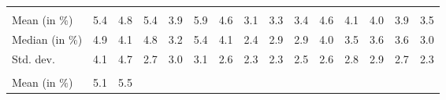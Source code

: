 \begin{tabular}{lllllllllllllll}
  \multicolumn{1}{|r}{} &
  \multicolumn{1}{r}{} &
  \multicolumn{1}{r}{} &
  \multicolumn{1}{r}{} &
  \multicolumn{1}{r}{} &
  \multicolumn{1}{r}{} &
  \multicolumn{1}{r}{} &
  \multicolumn{1}{r}{} &
  \multicolumn{1}{r}{} &
  \multicolumn{1}{r}{} &
  \multicolumn{1}{r}{} &
  \multicolumn{1}{r}{} &
  \multicolumn{1}{r}{} &
  \multicolumn{1}{r}{} \\
\multicolumn{1}{l}{\hspace{2em}Mean (in $\%$)} &
  \multicolumn{1}{|r}{5.4} &
  \multicolumn{1}{r}{4.8} &
  \multicolumn{1}{r}{5.4} &
  \multicolumn{1}{r}{3.9} &
  \multicolumn{1}{r}{5.9} &
  \multicolumn{1}{r}{4.6} &
  \multicolumn{1}{r}{3.1} &
  \multicolumn{1}{r}{3.3} &
  \multicolumn{1}{r}{3.4} &
  \multicolumn{1}{r}{4.6} &
  \multicolumn{1}{r}{4.1} &
  \multicolumn{1}{r}{4.0} &
  \multicolumn{1}{r}{3.9} &
  \multicolumn{1}{r}{3.5} \\
\multicolumn{1}{l}{\hspace{2em}Median (in $\%$)} &
  \multicolumn{1}{|r}{4.9} &
  \multicolumn{1}{r}{4.1} &
  \multicolumn{1}{r}{4.8} &
  \multicolumn{1}{r}{3.2} &
  \multicolumn{1}{r}{5.4} &
  \multicolumn{1}{r}{4.1} &
  \multicolumn{1}{r}{2.4} &
  \multicolumn{1}{r}{2.9} &
  \multicolumn{1}{r}{2.9} &
  \multicolumn{1}{r}{4.0} &
  \multicolumn{1}{r}{3.5} &
  \multicolumn{1}{r}{3.6} &
  \multicolumn{1}{r}{3.6} &
  \multicolumn{1}{r}{3.0} \\
\multicolumn{1}{l}{\hspace{2em}Std. dev.} &
  \multicolumn{1}{|r}{4.1} &
  \multicolumn{1}{r}{4.7} &
  \multicolumn{1}{r}{2.7} &
  \multicolumn{1}{r}{3.0} &
  \multicolumn{1}{r}{3.1} &
  \multicolumn{1}{r}{2.6} &
  \multicolumn{1}{r}{2.3} &
  \multicolumn{1}{r}{2.3} &
  \multicolumn{1}{r}{2.5} &
  \multicolumn{1}{r}{2.6} &
  \multicolumn{1}{r}{2.8} &
  \multicolumn{1}{r}{2.9} &
  \multicolumn{1}{r}{2.7} &
  \multicolumn{1}{r}{2.3} \\
\multicolumn{1}{l}{\hspace{1em}{\textit{Additive term} ($\widehat{t}/\widetilde{p}$)}} &
  \multicolumn{1}{|r}{} &
  \multicolumn{1}{r}{} &
  \multicolumn{1}{r}{} &
  \multicolumn{1}{r}{} &
  \multicolumn{1}{r}{} &
  \multicolumn{1}{r}{} &
  \multicolumn{1}{r}{} &
  \multicolumn{1}{r}{} &
  \multicolumn{1}{r}{} &
  \multicolumn{1}{r}{} &
  \multicolumn{1}{r}{} &
  \multicolumn{1}{r}{} &
  \multicolumn{1}{r}{} &
  \multicolumn{1}{r}{} \\
\multicolumn{1}{l}{\hspace{2em}Mean (in $\%$)} &
  \multicolumn{1}{|r}{5.1} &
  \multicolumn{1}{r}{5.5} &

\end{tabular}
